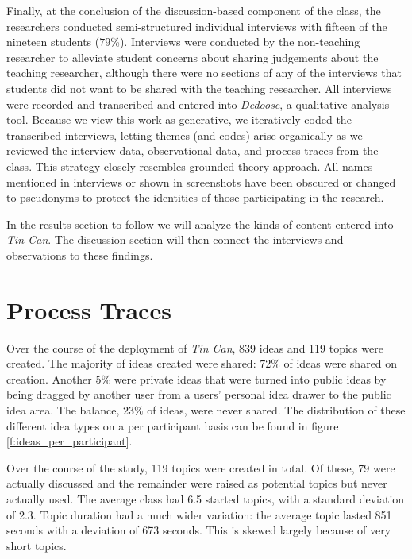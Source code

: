 Finally, at the conclusion of the discussion-based component of the class, the researchers conducted semi-structured individual interviews with fifteen of the nineteen students ($79$\%). Interviews were conducted by the non-teaching researcher to alleviate student concerns about sharing judgements about the teaching researcher, although there were no sections of any of the interviews that students did not want to be shared with the teaching researcher. All interviews were recorded and transcribed and entered into \emph{Dedoose}, a qualitative analysis tool. Because we view this work as generative, we iteratively coded the transcribed interviews, letting themes (and codes) arise organically as we reviewed the interview data, observational data, and process traces from the class. This strategy closely resembles  grounded theory approach. All names mentioned in interviews or shown in screenshots have been obscured or changed to pseudonyms to protect the identities of those participating in the research.

In the results section to follow we will analyze the kinds of content entered into \emph{Tin Can}.  The discussion section will then connect the interviews and observations to these findings.  


\section{Process Traces}

Over the course of the deployment of \emph{Tin Can}, 839 ideas and 119 topics were created. The  majority of ideas created were shared: $72\%$ of ideas were shared on creation. Another $5\%$ were private ideas that were turned into public ideas by being dragged by another user from a users' personal idea drawer to the public idea area. The balance, $23\%$ of ideas, were never shared. The distribution of these different idea types on a per participant basis can be found in figure \ref{f:ideas_per_participant}. 

Over the course of the study, 119 topics were created in total. Of these, 79 were actually discussed and the remainder were raised as potential topics but never actually used. The average class had 6.5 started topics, with a standard deviation of 2.3. Topic duration had a much wider variation: the average topic lasted 851 seconds with a deviation of 673 seconds. This is skewed largely because of very short topics. 

